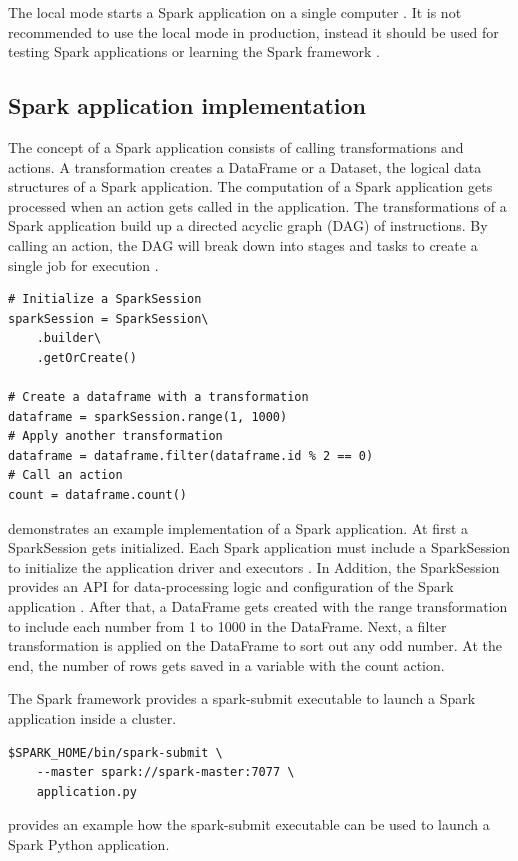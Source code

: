 The local mode starts a Spark application on a single computer \cite{Chambers2018Spark}. It is not recommended to use the local mode in production, instead it should be used for testing Spark applications or learning the Spark framework \cite{Chambers2018Spark}.


\subsection{Spark application implementation}
The concept of a Spark application consists of calling transformations and actions. A transformation creates a DataFrame or a Dataset, the logical data structures of a Spark application. The computation of a Spark application gets processed when an action gets called in the application. The transformations of a Spark application build up a directed acyclic graph (DAG) of instructions. By calling an action, the DAG will break down into stages and tasks to create a single job for execution \cite{Chambers2018Spark}.
\begin{lstlisting}[frame=single, label=lst:spark_python_example, caption=Example of a Python3 Spark application, captionpos=b]
# Initialize a SparkSession
sparkSession = SparkSession\
    .builder\
    .getOrCreate()

# Create a dataframe with a transformation
dataframe = sparkSession.range(1, 1000)
# Apply another transformation
dataframe = dataframe.filter(dataframe.id % 2 == 0)
# Call an action
count = dataframe.count()
\end{lstlisting}
 demonstrates an example implementation of a Spark application. At first a SparkSession gets initialized. Each Spark application must include a SparkSession to initialize the application driver and executors  \cite{Chambers2018Spark}. In Addition, the SparkSession provides an API for data-processing logic and configuration of the Spark application \cite{Hien2018Spark}. After that, a DataFrame gets created with the range transformation to include each number from 1 to 1000 in the DataFrame. Next, a filter transformation is applied on the DataFrame to sort out any odd number. At the end, the number of rows gets saved in a variable with the count action.
\todo{Create listing macro}



The Spark framework provides a spark-submit executable to launch a Spark application inside a cluster.
\begin{lstlisting}[frame=single, label=lst:spark_submit_example, caption=Execution of a Spark Python application using the spark-submit executable, captionpos=b]
$SPARK_HOME/bin/spark-submit \
    --master spark://spark-master:7077 \
    application.py
\end{lstlisting}
\Lst{lst:spark_submit_example} provides an example how the spark-submit executable can be used to launch a Spark Python application.


